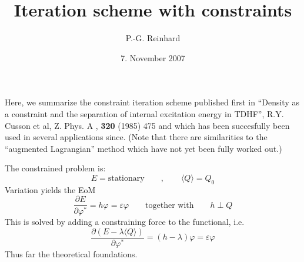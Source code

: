 
%
%

\textwidth 16cm
\textheight 20.5cm
\topmargin  -1.5cm
\oddsidemargin -0cm
\evensidemargin -0cm
\parindent 0cm
\parskip 33pt



\newcommand{\st}{^+}
\newcommand{\ue}{^{\mbox{}}}
\newcommand{\dfrac}[2]{{\displaystyle\frac{#1}{#2}}}
\newcommand{\sfrac}[2]{{\textstyle\frac{#1}{#2}}}
\newcommand{\home}{\hbar\omega}
\newcommand{\be}{\begin{equation}}
\newcommand{\ee}{\end{equation}}
\newcommand{\eel}[1]{\label{#1} \end{equation} \marginpar{#1} }
\newcommand{\bea}{\begin{eqnarray}}
\newcommand{\eea}{\end{eqnarray}}
\newcommand{\cJ}{{\cal J}}
\newcommand{\ncJ}{\nabla {\cal J}}
\newcommand{\sna}{\sigma \cdot \nabla}
\newcommand{\psa}{\psi_\alpha}
\newcommand{\psap}{\psi_\alpha^{(+)}}
\newcommand{\psam}{\psi_\alpha^{(-)}}
\newcommand{\psapm}{\psi_\alpha^{(\pm)}}
\newcommand{\mmp}{m_\alpha^{(+)}}
\newcommand{\mmm}{m_\alpha^{(-)}}
\newcommand{\up}[1]{^{\mbox{\small(#1)}}}
\newcommand{\comm}[1]{\\{\sl Comment: #1}}


\setlength{\unitlength}{1cm}






\renewcommand{\topfraction}{0.8}
\renewcommand{\textfraction}{0.2}
\renewcommand{\floatpagefraction}{0.8}
\renewcommand{\arraystretch}{1.5}



\title{Iteration scheme with constraints}
\author{P.-G. Reinhard}
\date{7. November 2007}
\maketitle

Here, we summarize the constraint iteration scheme published first in
{``Density as a constraint and the separation of internal excitation
  energy in {TDHF}''}, {R.Y. Cusson et al}, {Z. Phys. A }, {\bf 320}
(1985) 475 and which has been succesfully been used in several
applications since. (Note that there are similarities to the ``augmented
Lagrangian'' method which have not yet been fully worked out.)


The constrained problem is:
\be
    E = \mbox{stationary}
    \qquad , \qquad
    \langle Q \rangle = Q_0
\ee
Variation yields the EoM
\be
    \frac{\partial E}{\partial \varphi^*} = h \varphi = \varepsilon \varphi
    \qquad \mbox{together with} \qquad
    h \perp Q
\ee
This is solved by adding a constraining force to the functional, i.e.
\be
    \frac{\partial (E-\lambda \langle Q \rangle)}{\partial \varphi^*}
    =
    (h-\lambda) \varphi = \varepsilon \varphi
\ee
Thus far the theoretical foundations.

